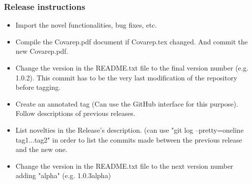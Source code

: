 \documentclass{article}
\begin{document}
    \subsubsection{Release instructions}
    \begin{itemize}
    \item Import the novel functionalities, bug fixes, etc.
    \item Compile the Covarep.pdf document if Covarep.tex changed. And commit the new Covarep.pdf.
    \item Change the version in the README.txt file to the final version number (e.g. 1.0.2). This commit has to be the very last modification of the repository before tagging.
    \item Create an annotated tag (Can use the GitHub interface for this purpose). Follow descriptions of previous releases.
    \item List novelties in the Release's description. (can use "git log --pretty=oneline tag1...tag2" in order to list the commits made between the previous release and the new one.
    \item Change the version in the README.txt file to the next version number adding "alpha" (e.g. 1.0.3alpha)
    \end{itemize}
    
% 
% 
\end{document}
